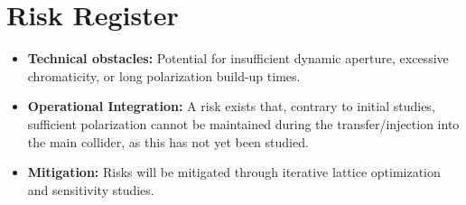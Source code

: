 \documentclass[aip,twocolumn,10pt,graphicx]{revtex4-1}
\begin{document}
\section{Risk Register}
\begin{itemize}
\item \textbf{Technical obstacles:} Potential for insufficient dynamic aperture, excessive chromaticity, or long polarization build-up times.
\item \textbf{Operational Integration:} A risk exists that, contrary to initial studies, sufficient polarization cannot be maintained during the transfer/injection into the main collider, as this has not yet been studied.
\item \textbf{Mitigation:} Risks will be mitigated through iterative lattice optimization and sensitivity studies.
\end{itemize}
%
%

%



\end{document}
